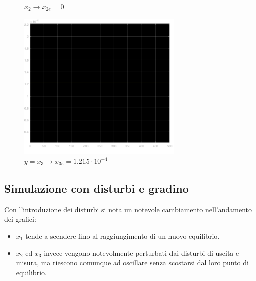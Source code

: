 \documentclass{article}
\begin{document}
\begin{figure}[!h]
\begin{minipage}{0.5\textwidth}
     \caption*{$x_2\longrightarrow x_{2e}=0$}
   \end{minipage}\hfill
\end{figure}

\begin{figure}[!h]
    \centering
     \includegraphics[width=0.7\textwidth]{grafici/x3_1.png}
     \caption*{$y=x_3\longrightarrow x_{3e}=1.215\cdot10^{-4}$}
\end{figure}
\newpage
\noindent
\subsection{Simulazione con disturbi e gradino}
Con l'introduzione dei disturbi si nota un notevole cambiamento nell'andamento dei grafici:
\begin{itemize}
    \item $x_1$ tende a scendere fino al raggiungimento di un nuovo equilibrio.
    \item $x_2$ ed $x_3$ invece vengono notevolmente perturbati dai disturbi di uscita e misura, ma riescono comunque ad oscillare senza scostarsi dal loro punto di equilibrio.
\end{itemize}
\end{document}
